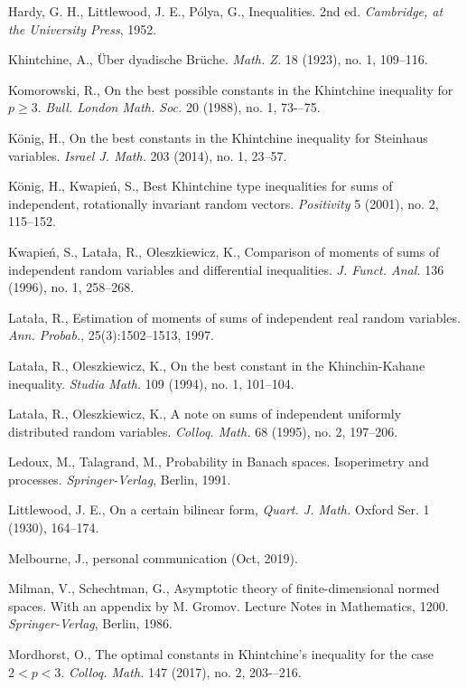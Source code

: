 \documentclass[10pt]{article}
\newcommand{\1}{\textbf{1}}
\theoremstyle{remark}
\theoremstyle{definition}
\begin{document}
\begin{thebibliography}{9}
Hardy, G. H., Littlewood, J. E., P\'olya, G.,
Inequalities.
2nd ed. \emph{Cambridge, at the University Press}, 1952.

Khintchine, A.,
\"Uber dyadische Br\"uche. 
\emph{Math. Z.} 18 (1923), no. 1, 109--116. 


Komorowski, R.,
On the best possible constants in the Khintchine inequality for $p\geq3$.
\emph{Bull. London Math. Soc.} 20 (1988), no. 1, 73-–75. 


K\"onig, H.,
On the best constants in the Khintchine inequality for Steinhaus variables.
\emph{Israel J. Math.} 203 (2014), no. 1, 23--57. 


K\"onig, H., Kwapie\'n, S.,
Best Khintchine type inequalities for sums of independent, rotationally invariant random vectors.
\emph{Positivity} 5 (2001), no. 2, 115--152.

Kwapie\'n, S., Lata\l a, R., Oleszkiewicz, K.,
Comparison of moments of sums of independent random variables and differential inequalities.
\emph{J. Funct. Anal.} 136 (1996), no. 1, 258--268. 

Lata\l a, R.,
Estimation of moments of sums of independent real random variables. 
\emph{Ann. Probab.}, 25(3):1502--1513, 1997.


Lata\l a, R., Oleszkiewicz, K.,
On the best constant in the Khinchin-Kahane inequality.
\emph{Studia Math.} 109 (1994), no. 1, 101--104. 


Lata\l a, R., Oleszkiewicz, K.,
A note on sums of independent uniformly distributed random variables. 
\emph{Colloq. Math.} 68 (1995), no. 2, 197--206. 


Ledoux, M., Talagrand, M., Probability in Banach spaces. Isoperimetry and processes. \emph{Springer-Verlag}, Berlin, 1991.

Littlewood, J. E., On a certain bilinear form, \emph{Quart. J. Math.} Oxford Ser. 1 (1930), 164--174.

Melbourne, J., personal communication (Oct, 2019).

Milman, V., Schechtman, G., Asymptotic theory of finite-dimensional normed spaces. With an appendix by M. Gromov. Lecture Notes in Mathematics, 1200. \emph{Springer-Verlag}, Berlin, 1986.

Mordhorst, O.,
The optimal constants in Khintchine's inequality for the case $2<p<3$.
\emph{Colloq. Math.} 147 (2017), no. 2, 203-–216. 


\end{thebibliography}
\end{document}
